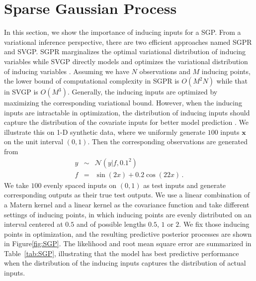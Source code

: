 \documentclass{article}
\begin{document}
\section{Sparse Gaussian Process} \label{sec:SGP}
In this section, we show the importance of inducing inputs for a SGP. From a variational inference perspective, there are two efficient approaches named SGPR and SVGP. SGPR marginalizes the optimal variational distribution of inducing variables \citep{Titsias_2009} while SVGP directly models and optimizes the variational distribution of inducing variables \citep{Hensman_2013}. Assuming we have $N$ observations and $M$ inducing points, the lower bound of computational complexity in SGPR is $O(M^2N)$ while that in SVGP is $O(M^3)$. Generally, the inducing inputs are optimized by maximizing the corresponding variational bound. However, when the inducing inputs are intractable in optimization, the distribution of inducing inputs should capture the distribution of the covariate inputs for better model prediction \cite{Raj_2011}. We illustrate this on 1-D synthetic data, where we uniformly generate $100$ inputs $\bm x$ on the unit interval $(0,1)$. Then the corresponding observations are generated from 
\begin{eqnarray}
y & \sim & \mathcal{N}(y|f, 0.1^2) \nonumber \\
f & = & \sin(2x) + 0.2\cos(22x) \nonumber \,.
\end{eqnarray} 
We take $100$ evenly spaced inputs on $(0,1)$ as test inputs and generate corresponding outputs as their true test outputs. We use a linear combination of a Matern kernel and a linear kernel as the covariance function and take different settings of inducing points, in which inducing points are evenly distributed on an interval centered at $0.5$ and of possible lengths $0.5$, $1$ or $2$. We fix those inducing points in optimization, and the resulting predictive posterior processes are shown in Figure\ref{fig:SGP}. The likelihood and root mean square error are summarized in Table~\ref{tab:SGP}, illustrating that the model has best predictive performance when the distribution of the inducing inputs captures the distribution of actual inputs.
\end{document}
